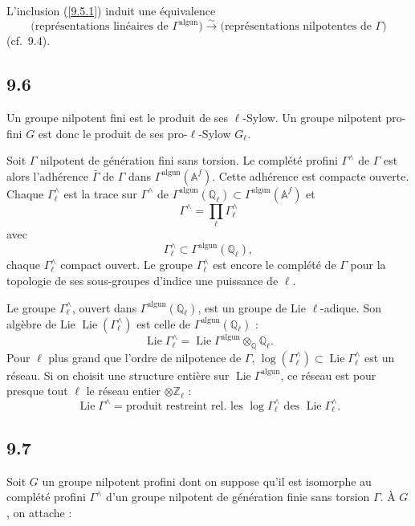 \documentclass[12pt,a4paper]{article}
\theoremstyle{plain}
\theoremstyle{definition}
\theoremstyle{remark}
\DeclareMathOperator{\Lie}{Lie}
\newcommand{\Q}{\mathbb{Q}}
\newcommand{\Z}{\mathbb{Z}}
\newcommand{\Af}{\mathbb{A}^f}
\newcommand{\alg}{\mathrm{alg}}
\newcommand{\un}{\mathrm{un}}
\begin{document}
L'inclusion (\ref{9.5.1}) induit une \'equivalence
$$\text{(repr\'esentations lin\'eaires de $\Gamma^{\alg \un}$)} \xrightarrow{\sim} \text{(repr\'esentations nilpotentes de $\Gamma$)}$$
(cf.~9.4).

\subsection*{9.6}

Un groupe nilpotent fini est le produit de ses $\ell$-Sylow. Un groupe nilpotent pro-fini $G$ est donc le produit de ses pro-$\ell$-Sylow $G_\ell$.

Soit $\Gamma$ nilpotent de g\'en\'eration fini sans torsion. Le compl\'et\'e profini $\Gamma^\wedge$ de $\Gamma$ est alors l'adh\'erence $\bar{\Gamma}$ de $\Gamma$ dans $\Gamma^{\alg \un}(\Af)$. Cette adh\'erence est compacte ouverte. Chaque $\Gamma^\wedge_\ell$ est la trace sur $\Gamma^\wedge$ de $\Gamma^{\alg \un}(\Q_\ell) \subset \Gamma^{\alg \un}(\Af)$ et
$$\Gamma^\wedge = \prod_\ell \Gamma^\wedge_\ell$$
avec
$$\Gamma^\wedge_\ell \subset \Gamma^{\alg \un}(\Q_\ell),$$
chaque $\Gamma^\wedge_\ell$ compact ouvert. Le groupe $\Gamma^\wedge_\ell$ est encore le compl\'et\'e de $\Gamma$ pour la topologie de ses sous-groupes d'indice une puissance de $\ell$.

Le groupe $\Gamma^\wedge_\ell$, ouvert dans $\Gamma^{\alg \un}(\Q_\ell)$, est un groupe de Lie $\ell$-adique. Son alg\`ebre de Lie $\Lie(\Gamma^\wedge_\ell)$ est celle de $\Gamma^{\alg \un}(\Q_\ell)$ :
\begin{equation}\label{9.6.1}
\Lie \Gamma^\wedge_\ell = \Lie \Gamma^{\alg \un} \otimes_\Q \Q_\ell. \tag{9.6.1}
\end{equation}
Pour $\ell$ plus grand que l'ordre de nilpotence de $\Gamma$, $\log(\Gamma^\wedge_\ell) \subset \Lie \Gamma^\wedge_\ell$ est un r\'eseau. Si on choisit une structure enti\`ere sur $\Lie \Gamma^{\alg \un}$, ce r\'eseau est pour presque tout $\ell$ le r\'eseau entier $\otimes \Z_\ell$ :
$$\Lie \Gamma^\wedge = \text{produit restreint rel.~les } \log \Gamma^\wedge_\ell \text{ des } \Lie \Gamma^\wedge_\ell.$$

\subsection*{9.7}

Soit $G$ un groupe nilpotent profini dont on suppose qu'il est isomorphe au compl\'et\'e profini $\Gamma^\wedge$ d'un groupe nilpotent de g\'en\'eration finie sans torsion $\Gamma$. \`A $G$, on attache :
\end{document}

